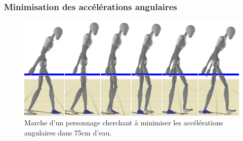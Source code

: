 \documentclass[runningheads,a4paper]{llncs}
\begin{document}
\subsubsection{Minimisation des accélérations angulaires}

\vspace*{-1.25cm}
\begin{figure}[h]
\centering
\includegraphics[scale=0.4]{strips/min_acc_75cm.png}
\caption{Marche d'un personnage cherchant à minimiser les accélérations angulaires dans 75cm d'eau.}
\label{fig:min_acc}
\end{figure}
\end{document}
